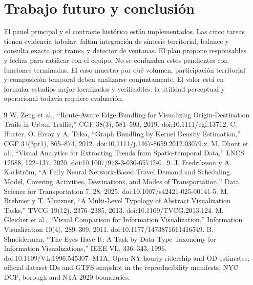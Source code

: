 \documentclass[10pt,twocolumn]{article}
\begin{document}
\section{Trabajo futuro y conclusión}
El panel principal y el contraste histórico están implementados. Las cinco tareas tienen evidencia tabular; faltan integración de síntesis territorial, balance y consulta exacta por tramo, y detector de ventanas. El plan propone responsables y fechas para ratificar con el equipo. No se confunden estos pendientes con funciones terminadas.
El caso muestra por qué volumen, participación territorial y composición temporal deben analizarse conjuntamente. El valor está en formular estudios mejor localizados y verificables; la utilidad perceptual y operacional todavía requiere evaluación.
\begin{thebibliography}{9}
 W. Zeng et al., ``Route-Aware Edge Bundling for Visualizing Origin-Destination Trails in Urban Traffic,'' CGF 38(3), 581--593, 2019. doi:10.1111/cgf.13712.
 C. Hurter, O. Ersoy y A. Telea, ``Graph Bundling by Kernel Density Estimation,'' CGF 31(3pt1), 865--874, 2012. doi:10.1111/j.1467-8659.2012.03079.x.
 M. Dhont et al., ``Visual Analytics for Extracting Trends from Spatio-temporal Data,'' LNCS 12588, 122--137, 2020. doi:10.1007/978-3-030-65742-0\_9.
 J. Fredriksson y A. Karlström, ``A Fully Neural Network-Based Travel Demand and Scheduling Model, Covering Activities, Destinations, and Modes of Transportation,'' Data Science for Transportation 7, 28, 2025. doi:10.1007/s42421-025-00141-5.
 M. Brehmer y T. Munzner, ``A Multi-Level Typology of Abstract Visualization Tasks,'' TVCG 19(12), 2376--2385, 2013. doi:10.1109/TVCG.2013.124.
 M. Gleicher et al., ``Visual Comparison for Information Visualization,'' Information Visualization 10(4), 289--309, 2011. doi:10.1177/1473871611416549.
 B. Shneiderman, ``The Eyes Have It: A Task by Data Type Taxonomy for Information Visualizations,'' IEEE VL, 336--343, 1996. doi:10.1109/VL.1996.545307.
 MTA, Open NY hourly ridership and OD estimates; official dataset IDs and GTFS snapshot in the reproducibility manifests. NYC DCP, borough and NTA 2020 boundaries.
\end{thebibliography}
\end{document}
